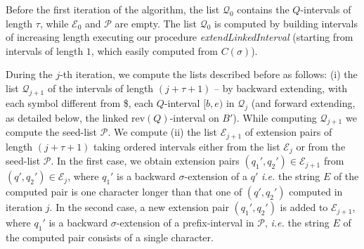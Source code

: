 \documentclass[runningheads,envcountsame,a4paper]{llncs}
\newcommand{\notaestesa}[2]{%
 \marginpar{\color{red!75!black}\textbf{\texttimes}}%
 {\color{red!75!black}%
 [\,\textbullet\,\textsf{\textbf{#1:}} %
 \textsf{\footnotesize#2}\,\textbullet\,]}%
}
\newcommand{\ie}{\textit{i.e.}\xspace}
\newcommand{\rev}{\ensuremath{\mathrm{rev}}}
\begin{document}





Before the first iteration of the algorithm, the list $\mathcal{Q}_0$ contains the
$Q$-intervals of length $\tau$, while  $\mathcal{E}_0$ and $\mathcal{P}$ are empty.
The list $\mathcal{Q}_0$ is computed  by building intervals of increasing length
executing our procedure \emph{extendLinkedInterval} (starting from intervals of
length $1$, which easily computed from $C(\sigma)$).



During the $j$-th iteration, we compute the lists described before as follows:
(i) the list $\mathcal{Q}_{j+1}$ of the
intervals of length $(j+\tau+1)$  -- by backward extending, with each symbol different from \$, each $Q$-interval $[b, e)$ in $\mathcal{Q}_{j}$ (and forward extending, as detailed  below, the
linked $\rev(Q)$-interval on $B'$). While computing $\mathcal{Q}_{j+1}$ we compute the seed-list $\mathcal{P}$.
We compute
(ii) the list $\mathcal{E}_{j+1}$ of
extension pairs of length $(j+\tau+1)$  taking ordered intervals   either from
the  list   $\mathcal{E}_{j}$ or from the seed-list $\mathcal{P}$.
In the first case,
we obtain  extension pairs $(q_{1}',q_{2}') \in \mathcal{E}_{j+1}$  from $(q',q_{2}')\in \mathcal{E}_{j}$, where
$q_{1}'$ is a backward $\sigma$-extension
of a $q'$   \ie the string $E$ of the computed pair is one
character longer than that one of $(q', q_{2}')$ computed in iteration $j$.
In the second case,
a new  extension pair
$(q_{1}',q_{2}')$ is added to $\mathcal{E}_{j+1}$, where   $q_{1}'$ is a backward $\sigma$-extension
of a prefix-interval in $\mathcal{P}$,  \ie the string $E$ of the computed pair
consists of a single character.
\end{document}
